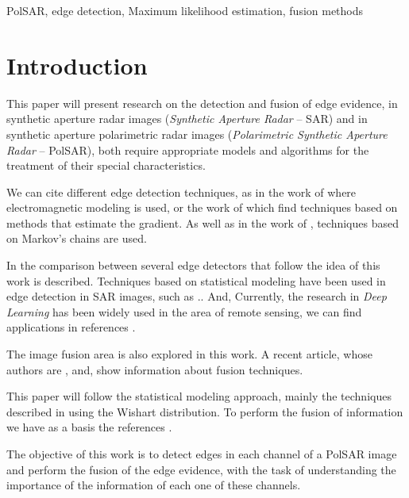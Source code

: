 \documentclass[conference]{IEEEtran}
\begin{document}
\begin{IEEEkeywords}
PolSAR, edge detection, Maximum likelihood estimation, fusion methods
\end{IEEEkeywords}

\section{Introduction}\label{sec_01}

This paper will present research on the detection and fusion of edge evidence, in synthetic aperture radar images (\textit{Synthetic Aperture Radar} -- SAR) and in synthetic aperture polarimetric radar images (\textit{Polarimetric Synthetic Aperture Radar} -- PolSAR), both require appropriate models and algorithms for the treatment of their special characteristics.

We can cite different edge detection techniques, as in the work of \cite{slf_2008} where electromagnetic modeling is used, or the work of \cite{tlb, obw, flmc, fyf} which find techniques based on methods that estimate the gradient. As well as in the work of \cite{bf}, techniques based on Markov's chains are used. 

In \cite{gfn} the comparison between several edge detectors that follow the idea of this work is described. Techniques based on statistical modeling have been used in edge detection in SAR images, such as \cite{gmbf, fbgm, horrit, gfn}.. And, Currently, the research in \textit{Deep Learning} has been widely used in the area of remote sensing, we can find applications in references \cite{bac, ztmxzxf, tabmm, xstz}. 

The image fusion area is also explored in this work. 
A recent article, whose authors are \cite{sglmla}, and, \cite{sg} show  information about fusion techniques.  

This paper will follow the statistical modeling approach, mainly the techniques described in \cite{fbgm, nhfc} using the Wishart distribution. To perform the fusion of information we have as a basis the references \cite{mit, sg}. 

The objective of this work is to detect edges in each channel of a PolSAR image and perform the fusion of the edge evidence, with the task of understanding the importance of the information of each one of these channels. 
\end{document}
